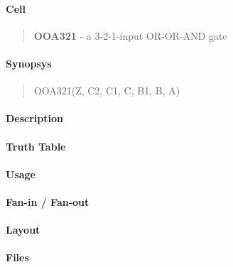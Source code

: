 \label{OOA321}
\paragraph{Cell}
\begin{quote}
    \textbf{OOA321} - a 3-2-1-input OR-OR-AND gate
\end{quote}

\paragraph{Synopsys}
\begin{quote}
    OOA321(Z, C2, C1, C, B1, B, A)
\end{quote}

\paragraph{Description}

%

\paragraph{Truth Table}
%

\paragraph{Usage}

\paragraph{Fan-in / Fan-out}

\paragraph{Layout}

\paragraph{Files}
